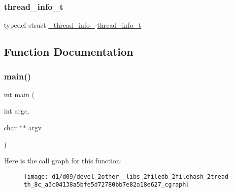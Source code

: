\subsubsection{\texorpdfstring{thread\_info\_t}{thread\_info\_t}}
{\footnotesize\ttfamily typedef struct \mbox{\hyperlink{struct__thread__info__}{\+\_\+thread\+\_\+info\+\_\+}} \mbox{\hyperlink{other__libs_2filedb_2filehash_2tread-th_8c_a9b5e9da8d3952d6ccc173282d0a5fcf8}{thread\+\_\+info\+\_\+t}}}



\subsection{Function Documentation}
\mbox{\label{devel_2other__libs_2filedb_2filehash_2tread-th_8c_a3c04138a5bfe5d72780bb7e82a18e627}} 
\subsubsection{\texorpdfstring{main()}{main()}}
{\footnotesize\ttfamily int main (\begin{DoxyParamCaption}\item[{int}]{argc,  }\item[{char $\ast$$\ast$}]{argv }\end{DoxyParamCaption})}

Here is the call graph for this function\+:
\nopagebreak
\begin{figure}[H]
\begin{center}
\leavevmode
\texttt{[image: d1/d09/devel\_2other\_\_libs\_2filedb\_2filehash\_2tread-th\_8c\_a3c04138a5bfe5d72780bb7e82a18e627\_cgraph]}
\end{center}
\end{figure}
